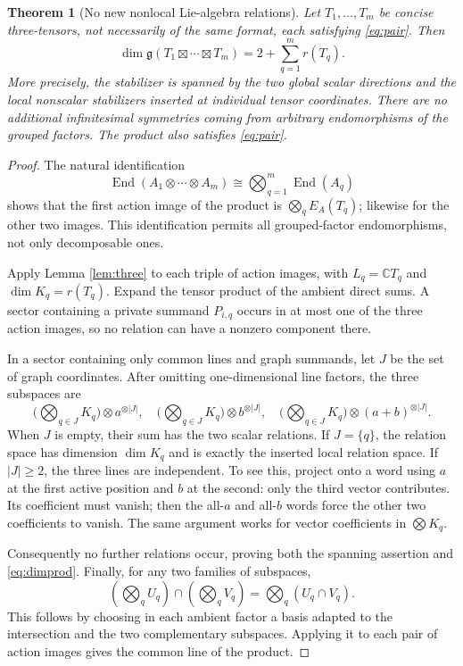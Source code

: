 \documentclass[11pt]{article}
\newtheorem{theorem}{Theorem}[section]
\theoremstyle{remark}\newtheorem{remark}[theorem]{Remark}
\newcommand{\C}{\mathbb C}
\newcommand{\End}{\operatorname{End}}
\newcommand{\gp}{\boxtimes}
\newcommand{\g}{\mathfrak g}
\begin{document}
\begin{theorem}[No new nonlocal Lie-algebra relations]\label{thm:product}
Let $T_1,\ldots,T_m$ be concise three-tensors, not necessarily of the same format, each satisfying \eqref{eq:pair}. Then
\begin{equation}\label{eq:dimprod}
 \dim\g(T_1\gp\cdots\gp T_m)=2+\sum_{q=1}^m r(T_q).
\end{equation}
More precisely, the stabilizer is spanned by the two global scalar directions and the local nonscalar stabilizers inserted at individual tensor coordinates. There are no additional infinitesimal symmetries coming from arbitrary endomorphisms of the grouped factors. The product also satisfies \eqref{eq:pair}.
\end{theorem}
\begin{proof}
The natural identification
\[
 \End(A_1\otimes\cdots\otimes A_m)\cong\bigotimes_{q=1}^m\End(A_q)
\]
shows that the first action image of the product is $\bigotimes_q E_A(T_q)$; likewise for the other two images. This identification permits all grouped-factor endomorphisms, not only decomposable ones.

Apply Lemma \ref{lem:three} to each triple of action images, with $L_q=\C T_q$ and $\dim K_q=r(T_q)$. Expand the tensor product of the ambient direct sums. A sector containing a private summand $P_{i,q}$ occurs in at most one of the three action images, so no relation can have a nonzero component there.

In a sector containing only common lines and graph summands, let $J$ be the set of graph coordinates. After omitting one-dimensional line factors, the three subspaces are
\[
 \Big(\bigotimes_{q\in J}K_q\Big)\otimes a^{\otimes |J|},\quad
 \Big(\bigotimes_{q\in J}K_q\Big)\otimes b^{\otimes |J|},\quad
 \Big(\bigotimes_{q\in J}K_q\Big)\otimes(a+b)^{\otimes |J|}.
\]
When $J$ is empty, their sum has the two scalar relations. If $J=\{q\}$, the relation space has dimension $\dim K_q$ and is exactly the inserted local relation space. If $|J|\geq2$, the three lines are independent. To see this, project onto a word using $a$ at the first active position and $b$ at the second: only the third vector contributes. Its coefficient must vanish; then the all-$a$ and all-$b$ words force the other two coefficients to vanish. The same argument works for vector coefficients in $\bigotimes K_q$.

Consequently no further relations occur, proving both the spanning assertion and \eqref{eq:dimprod}. Finally, for any two families of subspaces,
\[
 (\bigotimes_q U_q)\cap(\bigotimes_q V_q)=\bigotimes_q(U_q\cap V_q).
\]
This follows by choosing in each ambient factor a basis adapted to the intersection and the two complementary subspaces. Applying it to each pair of action images gives the common line of the product.
\end{proof}
\end{document}

